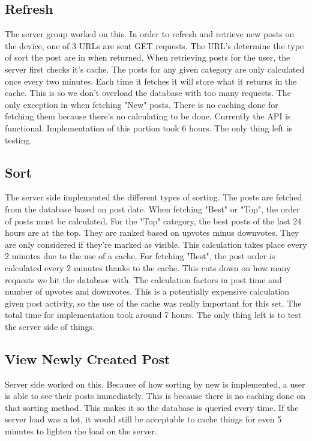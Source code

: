 \documentclass[12pt]{article}
\begin{document}
      \subsection{Refresh}
      The server group worked on this.  In order to refresh and retrieve new posts on the device, one of 3 URLs are sent GET requests.  The URL's determine the type of sort the post are in when returned.  When retrieving posts for the user, the server first checks it's cache.  The posts for any given category are only calculated once every two minutes.  Each time it fetches it will store what it returns in the cache.  This is so we don't overload the database with too many requests.  The only exception in when fetching "New" posts. There is no caching done for fetching them because there’s no calculating to be done.  Currently the API is functional.  Implementation of this portion took 6 hours.  The only thing left is testing.
      \subsection{Sort}
      The server side implemented the different types of sorting.  The posts are fetched from the database based on post date.  When fetching "Best" or "Top", the order of posts must be calculated.  For the "Top" category, the best posts of the last 24 hours are at the top.  They are ranked based on upvotes minus downvotes.  They are only considered if they're marked as visible.  This calculation takes place every 2 minutes due to the use of a cache.  For fetching "Best", the post order is calculated every 2 minutes thanks to the cache.  This cuts down on how many requests we hit the database with.  The calculation factors in post time and number of upvotes and downvotes.  This is a potentially expensive calculation given post activity, so the use of the cache was really important for this set.  The total time for implementation took around 7 hours.  The only thing left is to test the server side of things.
      \subsection{View Newly Created Post}
      Server side worked on this.  Because of how sorting by new is implemented, a user is able to see their posts immediately.  This is because there is no caching done on that sorting method.  This makes it so the database is queried every time.  If the server load was a lot, it would still be acceptable to cache things for even 5 minutes to lighten the load on the server.
\end{document}
